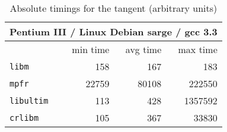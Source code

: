 \begin{table}[!htb]
\begin{center}
\renewcommand{\arraystretch}{1.2}
\begin{tabular}{|l|r|r|r|}
\hline
 \multicolumn{4}{|c|}{Pentium III / Linux Debian sarge / gcc 3.3}   \\ 
 \hline
                        & min time       & avg time     & max time        \\ 
 \hline
 \texttt{libm}          & 158           &        167    & 183      \\ 
 \hline
 \texttt{mpfr}          & 22759         &      80108    & 222550      \\ 
 \hline
 \texttt{libultim}      & 113           &        428    & 1357592      \\ 
 \hline
 \texttt{crlibm}         & 105           &        367    & 33830      \\ 
 \hline
\end{tabular}
\end{center}
\caption{Absolute timings for the tangent (arbitrary units)
  \label{tbl:tan_abstime}}
\end{table}


